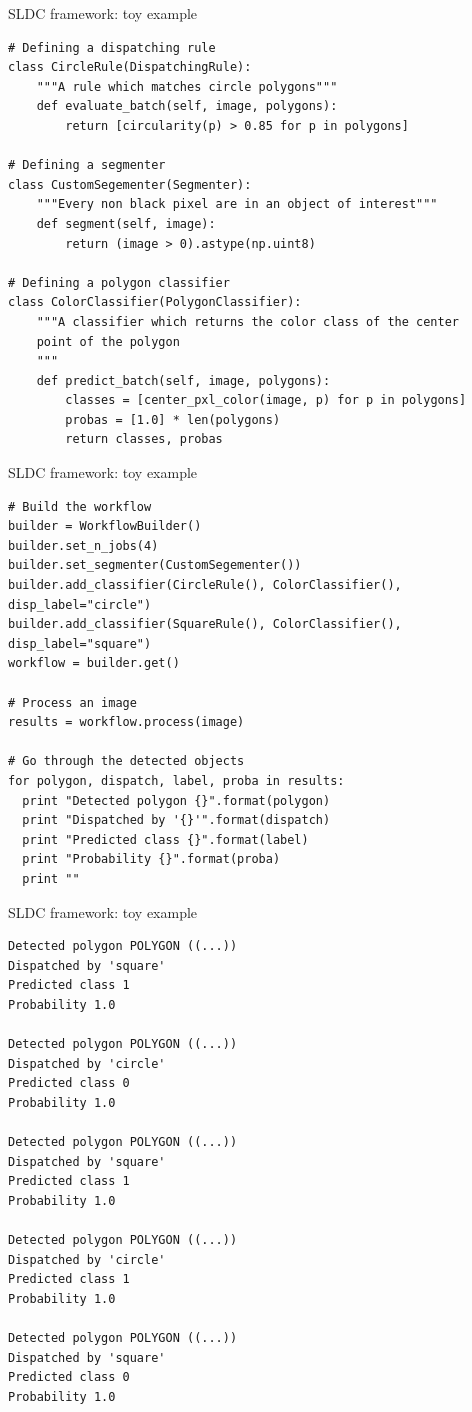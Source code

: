 \documentclass{beamer}
\begin{document}
\begin{frame}[fragile]{SLDC framework: toy example}
\begin{verbatim}
# Defining a dispatching rule 
class CircleRule(DispatchingRule):
    """A rule which matches circle polygons"""
    def evaluate_batch(self, image, polygons):
        return [circularity(p) > 0.85 for p in polygons]

# Defining a segmenter
class CustomSegementer(Segmenter):
    """Every non black pixel are in an object of interest"""
    def segment(self, image):
        return (image > 0).astype(np.uint8)
        
# Defining a polygon classifier
class ColorClassifier(PolygonClassifier):
    """A classifier which returns the color class of the center 
    point of the polygon
    """
    def predict_batch(self, image, polygons):
        classes = [center_pxl_color(image, p) for p in polygons]
        probas = [1.0] * len(polygons)
        return classes, probas
\end{verbatim}
\end{frame}


\begin{frame}[fragile]{SLDC framework: toy example}
\begin{verbatim}
# Build the workflow
builder = WorkflowBuilder()
builder.set_n_jobs(4)
builder.set_segmenter(CustomSegementer())
builder.add_classifier(CircleRule(), ColorClassifier(), disp_label="circle")
builder.add_classifier(SquareRule(), ColorClassifier(), disp_label="square")
workflow = builder.get()

# Process an image
results = workflow.process(image)

# Go through the detected objects
for polygon, dispatch, label, proba in results:
  print "Detected polygon {}".format(polygon)
  print "Dispatched by '{}'".format(dispatch)
  print "Predicted class {}".format(label)
  print "Probability {}".format(proba)
  print ""
\end{verbatim}
\end{frame}


\begin{frame}[fragile]{SLDC framework: toy example}
\begin{verbatim}
Detected polygon POLYGON ((...))
Dispatched by 'square'
Predicted class 1
Probability 1.0

Detected polygon POLYGON ((...))
Dispatched by 'circle'
Predicted class 0
Probability 1.0

Detected polygon POLYGON ((...))
Dispatched by 'square'
Predicted class 1
Probability 1.0

Detected polygon POLYGON ((...))
Dispatched by 'circle'
Predicted class 1
Probability 1.0

Detected polygon POLYGON ((...))
Dispatched by 'square'
Predicted class 0
Probability 1.0
\end{verbatim}
\end{frame}
\end{document}
